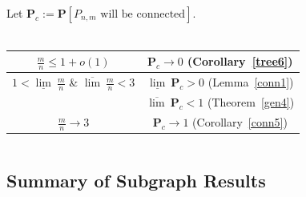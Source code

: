 \documentclass{article}
\newtheorem{Proof of Theorem}{Proof of Theorem}
\begin{document}
Let $\mathbf{P}_{c} := \mathbf{P}[P_{n,m} \textrm{ will be connected}]$. \\
\\
\begin{tabular} {c|c}
$\frac{m}{n} \leq 1+o(1)$ &
$\mathbf{P}_{c} \to 0$ (Corollary~\ref{tree6}) \\
\hline
$1 < \underline{\lim}~\frac{m}{n}$ \& $\overline{\lim}~\frac{m}{n} < 3$ &
$\underline{\lim}~\mathbf{P}_{c} > 0$ (Lemma~\ref{conn1}) \\
&
$\overline{\lim}~\mathbf{P}_{c} < 1$ (Theorem~\ref{gen4}) \\
\hline
$\frac{m}{n} \to 3$ &
$\mathbf{P}_{c} \to 1$ (Corollary~\ref{conn5})
\end{tabular}
\begin{displaymath}
\end{displaymath} 





\subsection*{Summary of Subgraph Results}
\end{document}
